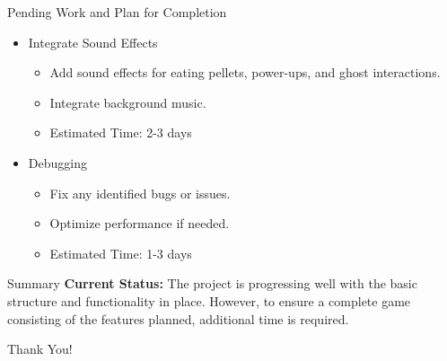 \documentclass{beamer}
\begin{document}
\begin{frame}{Pending Work and Plan for Completion}
    \begin{itemize}
        \item Integrate Sound Effects
            \begin{itemize}
                \item Add sound effects for eating pellets, power-ups, and ghost interactions.
                \item Integrate background music.
		\item Estimated Time: 2-3 days
	     \end{itemize}
        
        \item Debugging
            \begin{itemize}
                \item Fix any identified bugs or issues.
                \item Optimize performance if needed.
     	    	\item{Estimated Time: 1-3 days}
	    \end{itemize}
    \end{itemize}
  \end{frame}

\begin{frame}{Summary}
    \textbf{Current Status:} The project is progressing well with the basic structure and functionality in place. However, to ensure a complete game consisting of the features planned, additional time is required.
\end{frame}

\begin{frame}
    \centering
    \vfill
    \Huge Thank You!
    \vfill
\end{frame}
\end{document}
